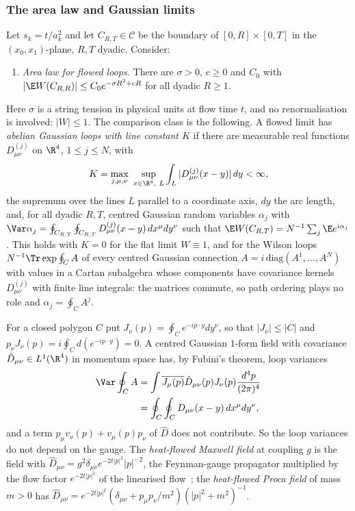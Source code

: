 \subsubsection{The area law and Gaussian limits}

Let $s_k=t/a_k^2$ and let $C_{R,T}\in\mathcal C$ be the boundary of
$[0,R]\times[0,T]$ in the $(x_0,x_1)$-plane, $R,T$ dyadic. Consider:
\begin{enumerate}[label=\textup{(A$_t$)},leftmargin=*]
\item \emph{Area law for flowed loops.} There are $\sigma>0$, $c\ge0$ and
$C_0$ with $|\E W(C_{R,R})|\le C_0e^{-\sigma R^2+cR}$ for all dyadic $R\ge1$.
\end{enumerate}
Here $\sigma$ is a string tension in physical units at flow time $t$, and
no renormalisation is involved: $|W|\le1$. The comparison class is the
following. A flowed limit has \emph{abelian Gaussian loops with line
constant $K$} if there are measurable real functions $D^{(j)}_{\mu\nu}$ on
$\R^4$, $1\le j\le N$, with
\[
K=\max_{j,\mu,\nu}\ \sup_{x\in\R^4,\ L}\int_L|D^{(j)}_{\mu\nu}(x-y)|\,dy<
\infty ,
\]
the supremum over the lines $L$ parallel to a coordinate axis, $dy$ the
arc length, and, for all dyadic $R,T$, centred Gaussian random variables
$\alpha_j$ with $\Var\alpha_j=\oint_{C_{R,T}}\oint_{C_{R,T}}D^{(j)}_{\mu\nu}
(x-y)\,dx^\mu dy^\nu$ such that $\E W(C_{R,T})=N^{-1}\sum_j\E e^{i\alpha_j}$.
This holds with $K=0$ for the flat limit $W\equiv1$, and for the Wilson loops
$N^{-1}\Tr\exp\oint_CA$ of every centred Gaussian connection $A=i\,
\mathrm{diag}(A^1,\dots,A^N)$ with values in a Cartan subalgebra whose
components have covariance kernels $D^{(j)}_{\mu\nu}$ with finite line
integrals: the matrices commute, so path ordering plays no role and
$\alpha_j=\oint_CA^j$.

For a closed polygon $C$ put $J_\nu(p)=\oint_Ce^{-ip\cdot y}dy^\nu$, so that
$|J_\nu|\le|C|$ and $p_\nu J_\nu(p)=i\oint_Cd(e^{-ip\cdot y})=0$. A centred
Gaussian $1$-form field with covariance $\hat D_{\mu\nu}\in L^1(\R^4)$ in
momentum space has, by Fubini's theorem, loop variances
\begin{equation}\label{rF13:eq:loopvar}
\begin{aligned}
\Var\oint_CA&=\int\overline{J_\mu(p)}\hat D_{\mu\nu}(p)J_\nu(p)\frac{d^4p}{
(2\pi)^4}\\&=\oint_C\oint_CD_{\mu\nu}(x-y)\,dx^\mu dy^\nu ,
\end{aligned}
\end{equation}
and a term $p_\mu v_\nu(p)+v_\mu(p)p_\nu$ of $\hat D$ does not contribute.
So the loop variances do not depend on the gauge. The \emph{heat-flowed
Maxwell field} at coupling $g$ is the field with $\hat D_{\mu\nu}=g^2
\delta_{\mu\nu}e^{-2t|p|^2}|p|^{-2}$, the Feynman-gauge propagator multiplied
by the flow factor $e^{-2t|p|^2}$ of the linearised flow~\cite[Sec.~2]{Lus10};
the \emph{heat-flowed Proca field} of mass $m>0$ has $\hat D_{\mu\nu}=
e^{-2t|p|^2}(\delta_{\mu\nu}+p_\mu p_\nu/m^2)(|p|^2+m^2)^{-1}$.

